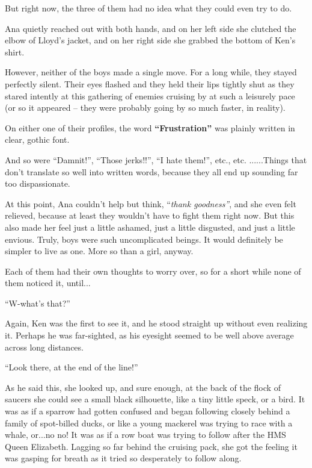 \documentclass[
]{article}
\begin{document}
But right now, the three of them had no idea what they could even try to
do.

Ana quietly reached out with both hands, and on her left side she
clutched the elbow of Lloyd's jacket, and on her right side she grabbed
the bottom of Ken's shirt.

However, neither of the boys made a single move. For a long while, they
stayed perfectly silent. Their eyes flashed and they held their lips
tightly shut as they stared intently at this gathering of enemies
cruising by at such a leisurely pace (or so it appeared -- they were
probably going by so much faster, in reality).

On either one of their profiles, the word \textbf{``Frustration''} was
plainly written in clear, gothic font.

And so were ``Damnit!'', ``Those jerks!!'', ``I hate them!'', etc., etc.
......Things that don't translate so well into written words, because
they all end up sounding far too dispassionate.

At this point, Ana couldn't help but think, ``\emph{thank goodness''},
and she even felt relieved, because at least they wouldn't have to fight
them right now. But this also made her feel just a little ashamed, just
a little disgusted, and just a little envious. Truly, boys were such
uncomplicated beings. It would definitely be simpler to live as one.
More so than a girl, anyway.

Each of them had their own thoughts to worry over, so for a short while
none of them noticed it, until...

``W-what's that?''

Again, Ken was the first to see it, and he stood straight up without
even realizing it. Perhaps he was far-sighted, as his eyesight seemed to
be well above average across long distances.

``Look there, at the end of the line!''

As he said this, she looked up, and sure enough, at the back of the
flock of saucers she could see a small black silhouette, like a tiny
little speck, or a bird. It was as if a sparrow had gotten confused and
began following closely behind a family of spot-billed ducks, or like a
young mackerel was trying to race with a whale, or...no no! It was as if
a row boat was trying to follow after the HMS Queen Elizabeth. Lagging
so far behind the cruising pack, she got the feeling it was gasping for
breath as it tried so desperately to follow along.
\end{document}
